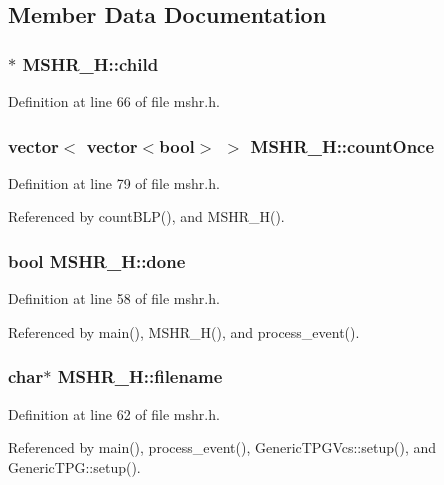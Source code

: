 \subsection{Member Data Documentation}
\subsubsection[{child}]{$\ast$ {\bf MSHR\_\-H::child}}\label{classMSHR__H_4806bb8e724a54f993b119bd9b4542fd}




Definition at line 66 of file mshr.h.
\subsubsection[{countOnce}]{\setlength{\rightskip}{0pt plus 5cm}vector$<$ vector$<$bool$>$ $>$ {\bf MSHR\_\-H::countOnce}}\label{classMSHR__H_788db7ac4c7430daf82deb2fd21f3316}




Definition at line 79 of file mshr.h.

Referenced by countBLP(), and MSHR\_\-H().
\subsubsection[{done}]{\setlength{\rightskip}{0pt plus 5cm}bool {\bf MSHR\_\-H::done}}\label{classMSHR__H_4cd1713ebd3ab9038ed231781b4bc36a}




Definition at line 58 of file mshr.h.

Referenced by main(), MSHR\_\-H(), and process\_\-event().
\subsubsection[{filename}]{\setlength{\rightskip}{0pt plus 5cm}char$\ast$ {\bf MSHR\_\-H::filename}}\label{classMSHR__H_2625121a72d102823d11503459b6322c}




Definition at line 62 of file mshr.h.

Referenced by main(), process\_\-event(), GenericTPGVcs::setup(), and GenericTPG::setup().
